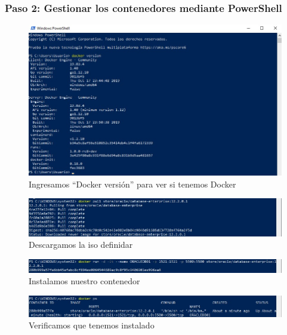 \documentclass[preprint,12pt]{elsarticle}
\begin{document}
\subsubsection{\textbf{Paso 2: Gestionar los contenedores mediante PowerShell}}

\begin{figure}[H]
	\begin{center}
		\includegraphics[width=12cm]{./IMAGENES/foto5} 
		\caption{Ingresamos “Docker versión” para ver si tenemos Docker}
	\end{center}
\end{figure}


\begin{figure}[H]
	\begin{center}
		\includegraphics[width=12cm]{./IMAGENES/foto6} 
		\caption{Descargamos la iso definidar}
	\end{center}
\end{figure}

\begin{figure}[H]
	\begin{center}
		\includegraphics[width=12cm]{./IMAGENES/foto10} 
		\caption{Instalamos nuestro contenedor}
	\end{center}
\end{figure}

\begin{figure}[H]
	\begin{center}
		\includegraphics[width=12cm]{./IMAGENES/foto11} 
		\caption{Verificamos que tenemos instalado}
	\end{center}
\end{figure}
\end{document}
